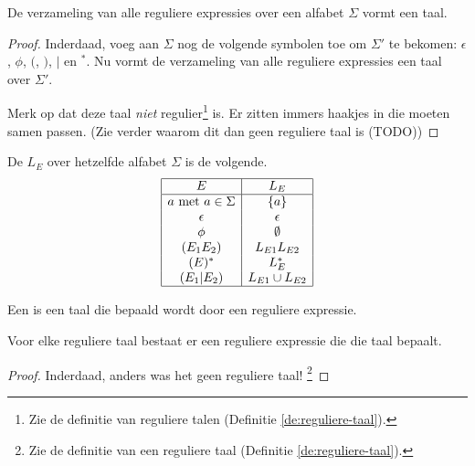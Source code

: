 \documentclass[main.tex]{subfiles}
\begin{document}
\begin{st}
  De verzameling van alle reguliere expressies over een alfabet $\Sigma$ vormt een taal.

  \begin{proof}
    Inderdaad, voeg aan $\Sigma$ nog de volgende symbolen toe om $\Sigma'$ te bekomen: $\epsilon$, $\phi$, $($, $)$, $|$ en $^{*}$.
    Nu vormt de verzameling van alle reguliere expressies een taal over $\Sigma'$.

    Merk op dat deze taal \emph{niet} regulier\footnote{Zie de definitie van reguliere talen (Definitie \ref{de:reguliere-taal}).} is. Er zitten immers haakjes in die moeten samen passen. (Zie verder waarom dit dan geen reguliere taal is (TODO)) 
  \end{proof}
\end{st}

\begin{de}
  \label{def:taal-bepaald-door-regex}
  De  $L_E$ over hetzelfde alfabet $\Sigma$ is de volgende.
  \[
  \begin{array}{|c|c|}
    \hline
    E                           & L_E\\
    \hline
    a \text{ met } a \in \Sigma & \{a\}\\
    \epsilon                    & {\epsilon}\\
    \phi                        & \emptyset\\
    (E_1E_2)                    & L_{E1}L_{E2}\\
    (E)^{*}                      & L_E^*\\
    (E_1|E_2)                   & L_{E1} \cup L_{E2}\\
    \hline
  \end{array}
  \]
\end{de}

\begin{de}
  \label{de:reguliere-taal}
  Een  is een taal die bepaald wordt door een reguliere expressie.
\end{de}

\begin{ei}
  Voor elke reguliere taal bestaat er een reguliere expressie die die taal bepaalt.

  \begin{proof}
    Inderdaad, anders was het geen reguliere taal! \footnote{Zie de definitie van een reguliere taal (Definitie \ref{de:reguliere-taal}).}
  \end{proof}
\end{ei}
\end{document}
